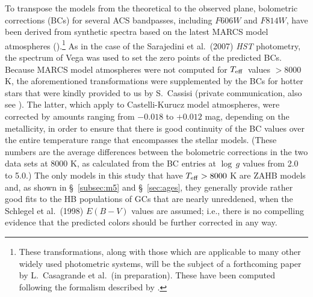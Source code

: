 \documentclass[12pt,preprint]{aastex}
\newcommand\teff{{T_{\rm eff}}}
\begin{document}
To transpose the models from the theoretical to the observed plane, bolometric
corrections (BCs) for several ACS bandpasses, including $F606W$ and $F814W$, have
been derived from synthetic spectra based on the latest MARCS model atmospheres
(\citealt{gee08}).\footnote{These transformations, along with those which are
applicable to many other widely used photometric systems, will be the subject 
of a forthcoming paper by L.~Casagrande et al.~(in preparation).  These have
been computed following the formalism described by \citet[][also see VandenBerg
et al.~2010, their \S 2]{cpf06}.}  As in the case of the Sarajedini et
al.~(2007) {\it HST} photometry, the \citet{bo07} spectrum of Vega was used
to set the zero points of the predicted BCs.  Because MARCS model atmospheres
were not computed for $\teff$\ values $> 8000\,$K, the aforementioned
transformations were supplemented by the BCs for hotter stars that were kindly
provided to us by S.~Cassisi (private communication, also see \citealt{bcc05}).
The latter, which apply to Castelli-Kurucz model atmospheres, were corrected by
amounts ranging from $-0.018$ to $+0.012$ mag, depending on the metallicity, in
order to ensure that there is good continuity of the BC values over the entire
temperature range that encompasses the stellar models.  (These numbers are the
average differences between the bolometric corrections in the two data sets at
8000 K, as calculated from the BC entries at $\log\,g$ values from 2.0 to 5.0.)
The only models in this study that have $\teff > 8000$ K are ZAHB models and,
as shown in \S~\ref{subsec:m5} and \S~\ref{sec:ages}, they generally provide
rather good fits to the HB populations of GCs that are nearly unreddened, when
the Schlegel et al.~(1998) $E(B-V)$ values are assumed; i.e., there is no
compelling evidence that the predicted colors should be further corrected in
any way.
\end{document}
